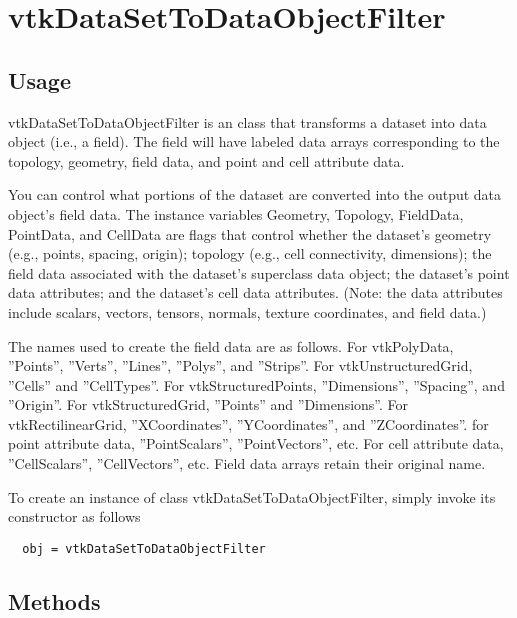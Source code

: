 \section{vtkDataSetToDataObjectFilter}

\subsection{Usage}

 vtkDataSetToDataObjectFilter is an class that transforms a dataset into
 data object (i.e., a field). The field will have labeled data arrays
 corresponding to the topology, geometry, field data, and point and cell
 attribute data.

 You can control what portions of the dataset are converted into the
 output data object's field data. The instance variables Geometry,
 Topology, FieldData, PointData, and CellData are flags that control
 whether the dataset's geometry (e.g., points, spacing, origin);
 topology (e.g., cell connectivity, dimensions); the field data
 associated with the dataset's superclass data object; the dataset's
 point data attributes; and the dataset's cell data attributes. (Note:
 the data attributes include scalars, vectors, tensors, normals, texture
 coordinates, and field data.)

 The names used to create the field data are as follows. For vtkPolyData, 
 ''Points'', ''Verts'', ''Lines'', ''Polys'', and ''Strips''. For vtkUnstructuredGrid,
 ''Cells'' and ''CellTypes''. For vtkStructuredPoints, ''Dimensions'', ''Spacing'', 
 and ''Origin''. For vtkStructuredGrid, ''Points'' and ''Dimensions''. For
 vtkRectilinearGrid, ''XCoordinates'', ''YCoordinates'', and ''ZCoordinates''.
 for point attribute data, ''PointScalars'', ''PointVectors'', etc. For cell
 attribute data, ''CellScalars'', ''CellVectors'', etc. Field data arrays retain
 their original name.

To create an instance of class vtkDataSetToDataObjectFilter, simply
invoke its constructor as follows
\begin{verbatim}
  obj = vtkDataSetToDataObjectFilter
\end{verbatim}
\subsection{Methods}

